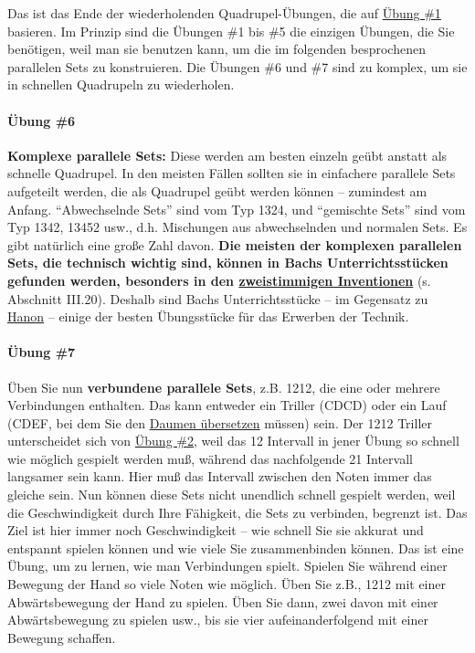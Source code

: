 Das ist das Ende der wiederholenden Quadrupel-Übungen, die auf \hyperref[c1iii7b1]{Übung \#1} basieren.
Im Prinzip sind die Übungen \#1 bis \#5 die einzigen Übungen, die Sie benötigen, weil man sie benutzen kann, um die im folgenden besprochenen parallelen Sets zu konstruieren.
Die Übungen \#6 und \#7 sind zu komplex, um sie in schnellen Quadrupeln zu wiederholen.


\paragraph{Übung \#6}
\label{c1iii7b6}

\textbf{Komplexe parallele Sets:} Diese werden am besten einzeln geübt anstatt als schnelle Quadrupel.
In den meisten Fällen sollten sie in einfachere parallele Sets aufgeteilt werden, die als Quadrupel geübt werden können -- zumindest am Anfang.
\enquote{Abwechselnde Sets} sind vom Typ 1324, und \enquote{gemischte Sets} sind vom Typ 1342, 13452 usw., d.h. Mischungen aus abwechselnden und normalen Sets.
Es gibt natürlich eine große Zahl davon.
\textbf{Die meisten der komplexen parallelen Sets, die technisch wichtig sind, können in Bachs Unterrichtsstücken gefunden werden, besonders in den \hyperref[c1iii20]{zweistimmigen Inventionen}} (s. Abschnitt III.20).
Deshalb sind Bachs Unterrichtsstücke -- im Gegensatz zu \hyperref[c1iii7h]{Hanon} -- einige der besten Übungsstücke für das Erwerben der Technik.


\paragraph{Übung \#7}
\label{c1iii7b7}

Üben Sie nun \textbf{verbundene parallele Sets}, z.B. 1212, die eine oder mehrere Verbindungen enthalten.
Das kann entweder ein Triller (CDCD) oder ein Lauf (CDEF, bei dem Sie den \hyperref[c1iii5a]{Daumen übersetzen} müssen) sein.
Der 1212 Triller unterscheidet sich von \hyperref[c1iii7b2]{Übung \#2}, weil das 12 Intervall in jener Übung so schnell wie möglich gespielt werden muß, während das nachfolgende 21 Intervall langsamer sein kann.
Hier muß das Intervall zwischen den Noten immer das gleiche sein.
Nun können diese Sets nicht unendlich schnell gespielt werden, weil die Geschwindigkeit durch Ihre Fähigkeit, die Sets zu verbinden, begrenzt ist.
Das Ziel ist hier immer noch Geschwindigkeit -- wie schnell Sie sie akkurat und entspannt spielen können und wie viele Sie zusammenbinden können.
Das ist eine Übung, um zu lernen, wie man Verbindungen spielt.
Spielen Sie während einer Bewegung der Hand so viele Noten wie möglich.
Üben Sie z.B., 1212 mit einer Abwärtsbewegung der Hand zu spielen.
Üben Sie dann, zwei davon mit einer Abwärtsbewegung zu spielen usw., bis sie vier aufeinanderfolgend mit einer Bewegung schaffen.

